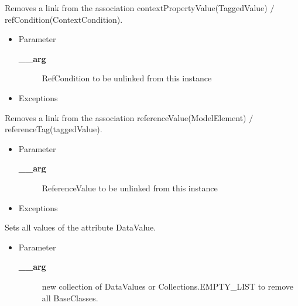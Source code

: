 \begin{desc}Removes a link from the association contextPropertyValue(TaggedValue)
 $/$ refCondition(ContextCondition).
\begin{itemize}
\item{Parameter
  \begin{description}
   \item[{\bf \_\_arg}]{RefCondition to be unlinked from this instance}
  \end{description}}
\end{itemize}
\begin{itemize}
\item{{Exceptions}
}
\end{itemize}
\end{desc}

\begin{desc}Removes a link from the association referenceValue(ModelElement)
 $/$ referenceTag(taggedValue).
\begin{itemize}
\item{Parameter
  \begin{description}
   \item[{\bf \_\_arg}]{ReferenceValue to be unlinked from this instance}
  \end{description}}
\end{itemize}
\begin{itemize}
\item{{Exceptions}
}
\end{itemize}
\end{desc}

\begin{desc}Sets all values of the attribute DataValue.
\begin{itemize}
\item{Parameter
  \begin{description}
   \item[{\bf \_\_arg}]{new collection of DataValues or Collections.EMPTY\_LIST to
        remove all BaseClasses.}
  \end{description}}
\end{itemize}
\end{desc}

